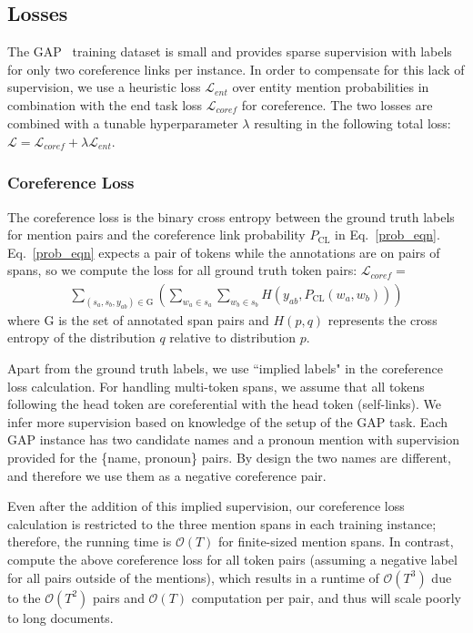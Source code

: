 \documentclass[12pt]{thesis-umich}[thesis]
\begin{document}
\subsection{Losses}
The GAP~\cite{webster2018gap} training dataset is small and provides sparse supervision with labels for only two coreference links per instance.
In order to compensate for this lack of supervision, we use a heuristic loss $\mathcal{L}_{\mathit{ent}}$ over entity mention probabilities  in combination with the end task loss $\mathcal{L}_{\mathit{coref}}$ for coreference. The two losses are combined with a tunable hyperparameter $\lambda$ resulting in the following total loss: $\mathcal{L} = \mathcal{L}_{\mathit{coref}} + \lambda \mathcal{L}_{\mathit{ent}}$. 

\subsubsection{Coreference Loss}
\label{sec:coref_loss}
The coreference loss is the binary cross entropy between the ground truth labels for mention pairs and the coreference link probability $P_{\mathrm{CL}}$ in 
Eq.~\eqref{prob_eqn}. 
Eq.~\eqref{prob_eqn} expects 
a pair of tokens while the annotations are on pairs of spans, so we compute the loss for all ground truth token pairs: $\mathcal{L}_{\mathit{coref}} =$
\begin{align*}
	\sum_{(s_a, s_b, y_{ab}) \in {\mathrm{G}}} \left(\sum_{w_a \in s_a} \sum_{w_b \in s_b} H(y_{ab}, P_{\mathrm{CL}}(w_a, w_b))\right)
\end{align*}
where $\mathrm{G}$ is the set of annotated span pairs and $H(p, q)$ represents the cross entropy of the distribution $q$ relative to distribution $p$.


Apart from the ground truth labels, we use 
``implied labels" in the coreference loss calculation.
For handling multi-token spans, we assume that all tokens following the head token are coreferential with the head token (self-links). 
We infer more supervision based on knowledge of the setup of the GAP task. Each GAP instance has two candidate names and a pronoun mention with supervision provided for the \{name, pronoun\} pairs. By design the two names are different, and therefore we use them as a negative coreference pair.

Even after the addition of this implied supervision, 
our coreference loss calculation is restricted to the three mention spans in each training instance; therefore, the running time is $\mathcal{O}(T)$ for finite-sized mention spans. 
In contrast, \citet{liu2019referential} compute the above coreference loss for all token pairs (assuming a negative label for all pairs outside of the mentions), which results in a runtime of $\mathcal{O}(T^3)$ due to the   $\mathcal{O}(T^2)$ pairs and $\mathcal{O}(T)$ computation per pair, and thus will scale poorly to long documents.
\end{document}
